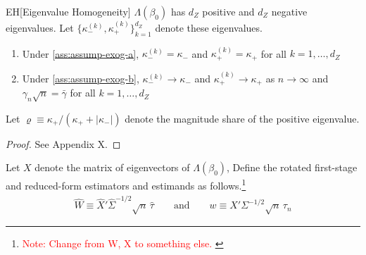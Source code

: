\begin{lemmap}{EH}[Eigenvalue Homogeneity]\label{lem:bnh}
\(\Lambda(\beta_0)\) has \(d_Z\) positive and \(d_Z\) negative eigenvalues.
Let \(\{\kappa^{(k)}_-,\kappa^{(k)}_+\}_{k=1}^{d_Z}\) denote these eigenvalues.     
    \begin{enumerate}
        \item 
        Under \ref{ass:assump-exog-a}, \(\kappa^{(k)}_-=\kappa_-\) and  \(\kappa^{(k)}_+=\kappa_+\) for all \(k=1,\ldots,d_Z\)
        \item 
        Under \ref{ass:assump-exog-b}, 
        \(\kappa^{(k)}_-\to\kappa_-\) and  \(\kappa^{(k)}_+\to\kappa_+\) as \(n\to\infty\) and \(\gamma_n\sqrt{n}=\bar \gamma\) for all \(k=1,\ldots,d_Z\)
    \end{enumerate}
    Let \(\varrho \equiv  \kappa_+ / (\kappa_++\lvert\kappa_-\rvert)\) denote the magnitude share of the positive eigenvalue.
\end{lemmap}
\begin{proof}
    See Appendix X.
\end{proof}
\noindent 
Let \(X\) denote the matrix of eigenvectors of \(\Lambda(\beta_0)\),
 Define the rotated first-stage and reduced-form estimators and estimands as follows.\footnote{\textcolor{red}{Note: Change from W, X to something else. }}
\begin{align}
    \hat W \equiv \hat X'\hat\Sigma^{-1/2}\sqrt{n}\,\hat\tau
    \qquad\text{and}\qquad
    w \equiv X'\Sigma^{-1/2}\sqrt{n}\,\tau_n    
\end{align}
